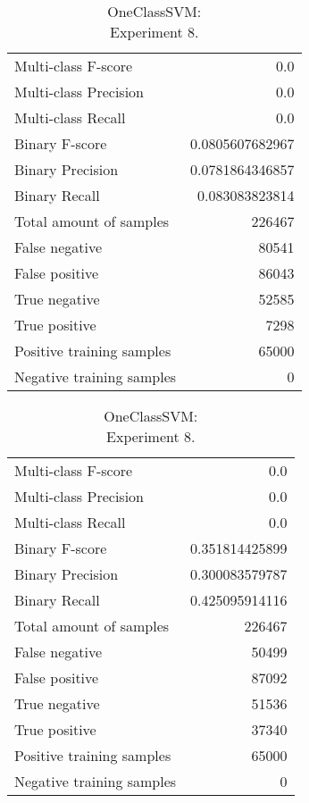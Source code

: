 \begin{table}[H]
\begin{minipage}{0.5\textwidth}
\caption{OneClassSVM: \\Experiment 7.}

\centering
\begin{tabular}{l r}
\toprule
Multi-class F-score & 0.0 \\
Multi-class Precision & 0.0 \\
Multi-class Recall & 0.0 \\
\midrule
Binary F-score & 0.0805607682967 \\
Binary Precision & 0.0781864346857 \\
Binary Recall & 0.083083823814 \\
\midrule
Total amount of samples & 226467 \\

False negative & 80541 \\
False positive & 86043 \\
True negative & 52585 \\
True positive & 7298 \\
\midrule
Positive training samples & 65000 \\
Negative training samples & 0 \\
\bottomrule
\end{tabular}

\end{minipage}
\hfillx
\begin{minipage}{0.5\textwidth}
\caption{OneClassSVM: \\Experiment 8.}

\centering
\begin{tabular}{l r}
\toprule
Multi-class F-score & 0.0 \\
Multi-class Precision & 0.0 \\
Multi-class Recall & 0.0 \\
\midrule
Binary F-score & 0.351814425899 \\
Binary Precision & 0.300083579787 \\
Binary Recall & 0.425095914116 \\
\midrule
Total amount of samples & 226467 \\

False negative & 50499 \\
False positive & 87092 \\
True negative & 51536 \\
True positive & 37340 \\
\midrule
Positive training samples & 65000 \\
Negative training samples & 0 \\
\bottomrule
\end{tabular}
\end{minipage}
\end{table}

